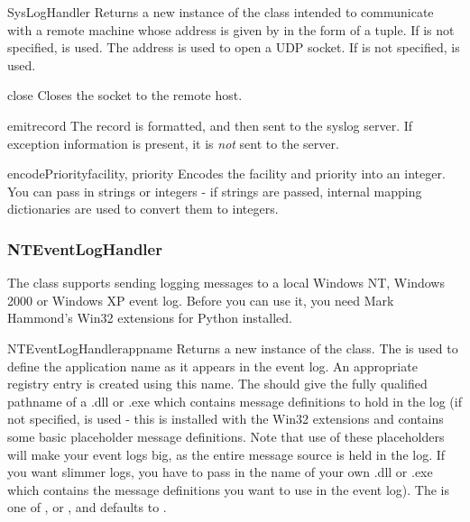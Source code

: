 \begin{classdesc}{SysLogHandler}{}
Returns a new instance of the  class intended to
communicate with a remote \UNIX{} machine whose address is given by
 in the form of a 
tuple.  If  is not specified,  is
used.  The address is used to open a UDP socket.  If  is
not specified,  is used.
\end{classdesc}

\begin{methoddesc}{close}{}
Closes the socket to the remote host.
\end{methoddesc}

\begin{methoddesc}{emit}{record}
The record is formatted, and then sent to the syslog server. If
exception information is present, it is \emph{not} sent to the server.
\end{methoddesc}

\begin{methoddesc}{encodePriority}{facility, priority}
Encodes the facility and priority into an integer. You can pass in strings
or integers - if strings are passed, internal mapping dictionaries are used
to convert them to integers.
\end{methoddesc}

\subsubsection{NTEventLogHandler}

The  class supports sending logging messages
to a local Windows NT, Windows 2000 or Windows XP event log. Before
you can use it, you need Mark Hammond's Win32 extensions for Python
installed.

\begin{classdesc}{NTEventLogHandler}{appname}
Returns a new instance of the  class. The
 is used to define the application name as it appears in the
event log. An appropriate registry entry is created using this name.
The  should give the fully qualified pathname of a .dll or .exe
which contains message definitions to hold in the log (if not specified,
 is used - this is installed with the Win32
extensions and contains some basic placeholder message definitions.
Note that use of these placeholders will make your event logs big, as the
entire message source is held in the log. If you want slimmer logs, you have
to pass in the name of your own .dll or .exe which contains the message
definitions you want to use in the event log). The  is one of
,  or , and
defaults to .
\end{classdesc}

